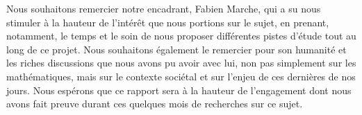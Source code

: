 \vspace{1em}

Nous souhaitons remercier notre encadrant, Fabien Marche, qui a su nous stimuler à la hauteur de l'intérêt que nous portions sur le sujet, en prenant, notamment, le temps et le soin de nous proposer différentes pistes d'étude 
tout au long de ce projet. Nous souhaitons également le remercier pour son humanité et les riches discussions que nous avons pu avoir avec lui, non pas simplement sur les mathématiques, mais sur le contexte sociétal et sur l'enjeu de ces dernières de nos jours.
Nous espérons que ce rapport sera à la hauteur de l'engagement dont nous avons fait preuve durant ces quelques mois de recherches sur ce sujet.